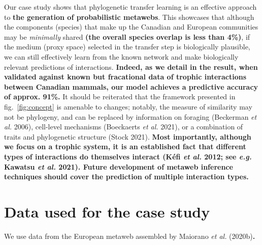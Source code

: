\documentclass[11pt]{article}
\makeatletter
\def\maxwidth{\ifdim\Gin@nat@width>\linewidth\linewidth
\else\Gin@nat@width\fi}
\let\Oldincludegraphics\includegraphics
\renewcommand{\includegraphics}[1]{\Oldincludegraphics[width=\maxwidth]{#1}}
\providecommand{\DIFaddtex}[1]{{\bf #1}} %
\providecommand{\DIFdeltex}[1]{} %
\providecommand{\DIFaddbegin}{\protect\color{blue}} %
\providecommand{\DIFaddend}{\protect\color{black}} %
\providecommand{\DIFdelbegin}{\protect\color{red}} %
\providecommand{\DIFdelend}{\protect\color{black}} %
\providecommand{\DIFadd}[1]{\texorpdfstring{\DIFaddtex{#1}}{#1}} %
\providecommand{\DIFdel}[1]{\texorpdfstring{\DIFdeltex{#1}}{}} %
\newcommand{\DIFscaledelfig}{0.5}
\newlength{\DIFdelgraphicswidth} %
\newlength{\DIFdelgraphicsheight} %
\newcommand{\DIFaddincludegraphics}[2][]{{\color{blue}\fbox{\DIFOincludegraphics[#1]{#2}}}} %
\newcommand{\DIFdelincludegraphics}[2][]{%
\sbox{\DIFdelgraphicsbox}{\DIFOincludegraphics[#1]{#2}}%
\settoboxwidth{\DIFdelgraphicswidth}{\DIFdelgraphicsbox} %
\settoboxtotalheight{\DIFdelgraphicsheight}{\DIFdelgraphicsbox} %
\scalebox{\DIFscaledelfig}{%
\parbox[b]{\DIFdelgraphicswidth}{\usebox{\DIFdelgraphicsbox}\\[-\baselineskip] \rule{\DIFdelgraphicswidth}{0em}}\llap{\resizebox{\DIFdelgraphicswidth}{\DIFdelgraphicsheight}{%
\setlength{\unitlength}{\DIFdelgraphicswidth}%
\begin{picture}(1,1)%
\thicklines\linethickness{2pt} %
{\color[rgb]{1,0,0}\put(0,0){\framebox(1,1){}}}%
{\color[rgb]{1,0,0}\put(0,0){\line( 1,1){1}}}%
{\color[rgb]{1,0,0}\put(0,1){\line(1,-1){1}}}%
\end{picture}%
}\hspace*{3pt}}} %
} %
\DeclareRobustCommand{\DIFaddbegin}{\DIFOaddbegin \let\includegraphics\DIFaddincludegraphics} %
\DeclareRobustCommand{\DIFaddend}{\DIFOaddend \let\includegraphics\DIFOincludegraphics} %
\DeclareRobustCommand{\DIFdelbegin}{\DIFOdelbegin \let\includegraphics\DIFdelincludegraphics} %
\DeclareRobustCommand{\DIFdelend}{\DIFOaddend \let\includegraphics\DIFOincludegraphics} %
\makeatother
\begin{document}
\DIFaddend Our case study shows that phylogenetic transfer learning is \DIFdelbegin \DIFdel{indeed }\DIFdelend an effective
approach to \DIFdelbegin \DIFdel{predict the Canadian mammalian metaweb}\DIFdelend \DIFaddbegin \DIFadd{the generation of probabilistic metawebs}\DIFaddend . This showcases
that although the components (species) that make up the Canadian and
European communities may be \emph{minimally} shared \DIFaddbegin \DIFadd{(the overall species
overlap is less than 4\%)}\DIFaddend , if the medium (proxy space) selected in the
transfer step is biologically plausible, we can still effectively learn
from the known network and make biologically relevant predictions of
interactions. \DIFaddbegin \DIFadd{Indeed, as we detail in the result, when validated against
known but fracational data of trophic interactions between Canadian
mammals, our model achieves a predictive accuracy of approx. 91\%. }\DIFaddend It
should be reiterated that the framework presented in
fig.~\ref{fig:concept} is amenable to changes; notably, the measure of
similarity may not be phylogeny, and can be replaced by information on
foraging (Beckerman \emph{et al.} 2006), cell-level mechanisms
(Boeckaerts \emph{et al.} 2021), or a combination of traits and
phylogenetic structure (Stock 2021). \DIFaddbegin \DIFadd{Most importantly, although we focus
on a trophic system, it is an established fact that different types of
interactions do themselves interact (Kéfi \emph{et al.} 2012; see
\emph{e.g.} Kawatsu \emph{et al.} 2021). Future development of metaweb
inference techniques should cover the prediction of multiple interaction
types.
}\DIFaddend 

\hypertarget{data-used-for-the-case-study}{%
\section{Data used for the case
study}\label{data-used-for-the-case-study}}

We use data from the European metaweb assembled by Maiorano \emph{et
al.} (2020b)\DIFdelbegin \DIFdel{, following the definition of the metaweb first introduced
by Dunne (2006), \emph{i.e.} an inventory of all possible interactions
within species from a spatially delimited pool.
Notably the metaweb is
not a prediction of the food web at any specific locale within the
frontiers of the species pool -- in fact, these local food webs are
expected to have a subset of both the species and the interactions of
their metaweb (Poisot \emph{et al.} 2012). This being said, as the
metaweb represents the total of functional, phylogenetic, and
macroecological processes (Morales-Castilla \emph{et al.} 2015), it is
thus still worthy of ecological attention. We deduced }\DIFdelend \DIFaddbegin \DIFadd{.
}
\end{document}
